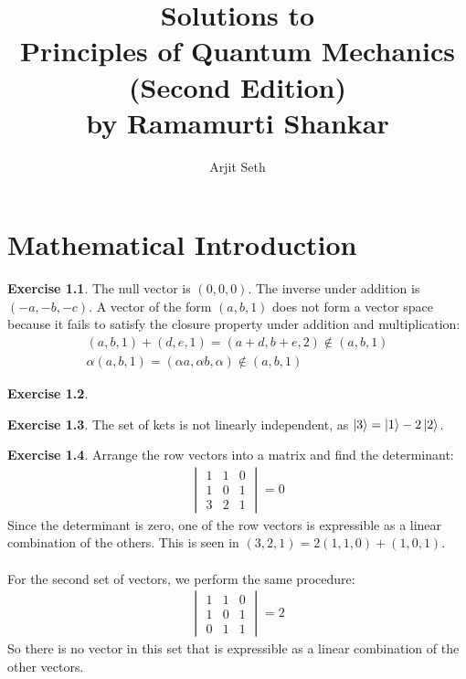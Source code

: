 \documentclass{report}
\theoremstyle{definition}
\newtheorem{chapter1}{Exercise}
\begin{document}
\title{Solutions to \\Principles of Quantum Mechanics (Second Edition)\\ by Ramamurti Shankar}
\date{}
\author{Arjit Seth}

\maketitle

\chapter{Mathematical Introduction}

\begin{chapter1}\label{prob:1}
	The null vector is $(0,0,0)$. The inverse under addition is $(-a,-b,-c)$. A vector of the form $(a,b,1)$ does not form a vector space because it fails to satisfy the closure property under addition and multiplication:
	\begin{gather*}
		(a,b,1) + (d,e,1) = (a+d, b+e, 2) \notin (a,b,1) \\
		\alpha(a,b,1) = (\alpha a, \alpha b, \alpha) \notin (a,b,1)
	\end{gather*}
	
\end{chapter1}

\begin{chapter1}\label{prob:2}
	
\end{chapter1}

\begin{chapter1}\label{prob:3}
	The set of kets is not linearly independent, as $\ket 3 = \ket 1 -2\ket 2$.
\end{chapter1}

\begin{chapter1}\label{prob:4}
	Arrange the row vectors into a matrix and find the determinant:
		\begin{gather*}
			\begin{vmatrix}
				1 & 1 & 0 \\
				1 & 0 & 1 \\
				3 & 2 & 1 
			\end{vmatrix}
			= 0
		\end{gather*}
		Since the determinant is zero, one of the row vectors is expressible as a linear combination of the others. This is seen in $(3,2,1) = 2(1,1,0) + (1,0,1)$. \\\\
		For the second set of vectors, we perform the same procedure:
		\begin{gather*}
			\begin{vmatrix}
				1 & 1 & 0 \\
				1 & 0 & 1 \\
				0 & 1 & 1
			\end{vmatrix}
			= 2
		\end{gather*}
		So there is no vector in this set that is expressible as a linear combination of the other vectors.\\\\
\end{chapter1}
\end{document}
